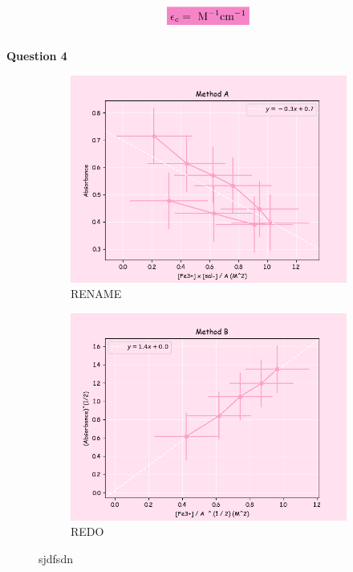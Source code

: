 \begin{equation}
   \mathcolorbox{Lavender}{ \epsilon_c =  \text{ M}^{-1}\text{cm} ^ {-1}}
    \label{eq:part2_ext_coeff}
\end{equation}
\\
\textbf{Question 4}
\begin{figure}[H]
     \centering
     \begin{subfigure}[b]{0.49\textwidth}
         \centering
         \includegraphics[width=\textwidth]{part2_q4a.png}
         \caption{RENAME}
         \label{fig:part2_q4_a}
     \end{subfigure}
     \hfill
     \begin{subfigure}[b]{0.49\textwidth}
         \centering
         \includegraphics[width=\textwidth]{part2_q4b.png}
         \caption{REDO}
         \label{fig:part2_q4_b}
     \end{subfigure}
     \caption{sjdfsdn}
     \label{fig:part2q4}
\end{figure}
